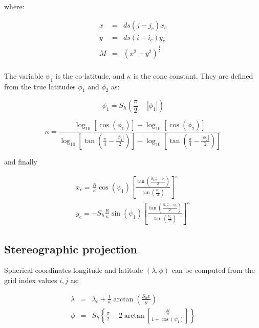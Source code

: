 where:

\begin{eqnarray}
  x &=& ds \left(j-j_c\right) x_c \\
  y &=& ds \left(i-i_c\right) y_c \\
  M &=& \left(x^2+y^2\right)^{\frac{1}{2}} \\
\end{eqnarray}

The variable $\psi_1$ is the co-latitude, and $\kappa$ is the cone constant.
They are defined from the true latitudes $\phi_1$ and $\phi_2$ as:

\begin{equation}
  \psi_1 = S_h \left(\frac{\pi}{2} - |\phi_1| \right)
\end{equation}

\begin{equation}
  \kappa = \frac{\log_{10}\left[\cos(\phi_1)\right] - 
                 \log_{10}\left[\cos(\phi_2)\right]}
                {\log_{10}\left[\tan(\frac{\pi}{4}-\frac{|\phi_1|}{2})\right]-
                 \log_{10}\left[\tan(\frac{\pi}{4}-\frac{|\phi_2|}{2})\right]}
\end{equation}

and finally

\begin{eqnarray}
  x_c = \frac{R}{\kappa} \cos(\psi_1) \left[\frac{\tan\left(
         \frac{S_h \frac{\pi}{2}-\phi_c}{2}\right)}
         {\tan\left(\frac{\psi_1}{2}\right)} \right]^\kappa \\
  y_c = -S_h \frac{R}{\kappa} \sin(\psi_1) \left[\frac{\tan\left(
         \frac{S_h \frac{\pi}{2}-\phi_c}{2}\right)}
         {\tan\left(\frac{\psi_1}{2}\right)} \right]^\kappa
\end{eqnarray}

\subsection{Stereographic projection}

Spherical coordinates longitude and latitude $(\lambda, \phi)$ can be computed
from the grid index values $i,j$ as:

\begin{eqnarray}
  \lambda &=& \lambda_c + 
         \frac{1}{\kappa}\arctan\left(\frac{S_h x}{y}\right) \\
  \phi &=& S_h \left\{ \frac{\pi}{2} - 
              2 \arctan\left[\frac{\frac{M}{R}}{1+\cos(\psi_1)}\right]
              \right\}
\end{eqnarray}

